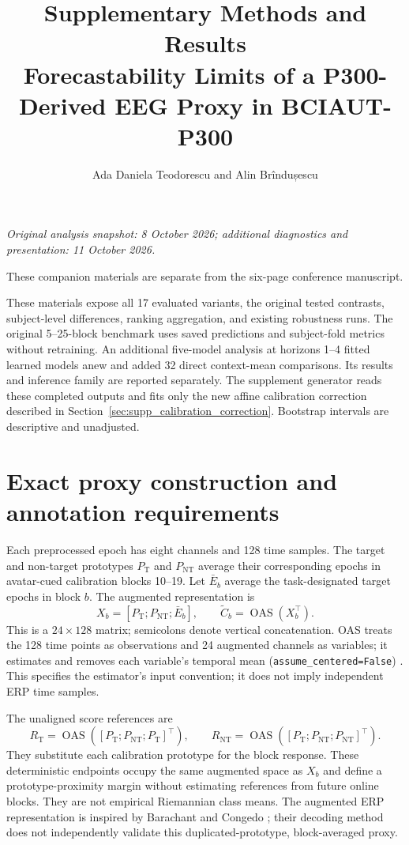 \documentclass[a4paper,10pt,onecolumn]{IEEEtran}
\title{Supplementary Methods and Results\\[4pt]
\large Forecastability Limits of a P300-Derived EEG Proxy in BCIAUT-P300}
\author{Ada Daniela Teodorescu and Alin Brîndușescu}
\begin{document}
\maketitle
\thispagestyle{plain}
\textit{Original analysis snapshot: 8 October 2026; additional diagnostics and presentation: 11 October 2026.}

These companion materials are separate from the six-page conference
manuscript.

These materials expose all 17 evaluated variants, the original tested contrasts,
subject-level differences, ranking aggregation, and existing robustness runs.
The original 5--25-block benchmark uses saved predictions and subject-fold
metrics without retraining. An additional five-model analysis at horizons
1--4 fitted learned models anew and added 32 direct context-mean comparisons.
Its results and inference family are reported separately. The supplement
generator reads these completed outputs and fits only the new affine calibration
correction described in Section~\ref{sec:supp_calibration_correction}. Bootstrap intervals
are descriptive and unadjusted.

\section{Exact proxy construction and annotation requirements}

Each preprocessed epoch has eight channels and 128 time samples.
The target and non-target prototypes $P_{\mathrm T}$ and $P_{\mathrm{NT}}$
average their corresponding epochs in avatar-cued calibration blocks 10--19.
Let $\bar E_b$ average the task-designated target epochs in block $b$.
The augmented representation is
\begin{equation}
X_b=[P_{\mathrm T};P_{\mathrm{NT}};\bar E_b],
\qquad \widetilde C_b=\operatorname{OAS}(X_b^\top).
\end{equation}
This is a $24\times128$ matrix; semicolons denote vertical concatenation.
OAS treats the 128 time points
as observations and 24 augmented channels as variables; it estimates and
removes each variable's temporal mean
(\texttt{assume\_centered=False}) \cite{ChenWienerShrinkage2010}.
This specifies the estimator's input convention; it does not imply
independent ERP time samples.

The unaligned score references are
\begin{equation}
R_{\mathrm T}=\operatorname{OAS}([P_{\mathrm T};P_{\mathrm{NT}};P_{\mathrm T}]^\top),
\qquad
R_{\mathrm{NT}}=\operatorname{OAS}([P_{\mathrm T};P_{\mathrm{NT}};P_{\mathrm{NT}}]^\top).
\end{equation}
They substitute each calibration prototype for the block response.
These deterministic endpoints occupy the same augmented space as $X_b$
and define a prototype-proximity margin without estimating references
from future online blocks. They are not empirical Riemannian class means.
The augmented ERP representation is inspired by Barachant and Congedo
\cite{Barachant2014}; their decoding method does not independently validate
this duplicated-prototype, block-averaged proxy.
\end{document}
